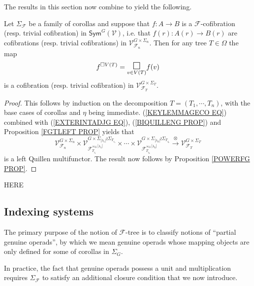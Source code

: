 \documentclass[a4paper,10pt]{article}%
\begin{document}
The results in this section now combine to yield the following.


\begin{proposition}\label{AUTTCOFPUSH PROP}
  Let $\Sigma_{\mathcal{F}}$ be a family of corollas 
  and suppose that 
  $f \colon A \to B$ is a $\mathcal{F}$-cofibration (resp. trivial cofibration)
  in $\mathsf{Sym}^G(\mathcal{V})$, i.e. that 
  $f(r) \colon A(r) \to B(r)$ are cofibrations (resp. trivial cofibrations) in 
  $\mathcal{V}^{G \times \Sigma_n}_{\mathcal{F}_n}$. Then for any tree $T \in \Omega$ the map
  \[
  f^{\square V(T)} = 
  \underset{v \in V(T)}{\mathlarger{\mathlarger{\square}}}
  f(v)\]
  is a cofibration (resp. trivial cofibration) in 
  $\mathcal{V}^{G \times \Sigma_T}_{\mathcal{F}_T}$.
\end{proposition}


\begin{proof}
  This follows by induction on the decomposition 
  $T=(T_1,\cdots,T_n)$, with the base cases of corollas and $\eta$ being immediate. (\ref{KEYLEMMAGECO EQ}) combined with (\ref{EXTERINTADJG EQ}), (\ref{BIQUILLENG PROP}) and Proposition \ref{FGTLEFT PROP} yields that
  \[
  \mathcal{V}^{G \times \Sigma_n}_{\mathcal{F}_n}	
  \times
  \mathcal{V}
  ^{G \times \Sigma_{|\lambda_1|}\wr \Sigma_{T_{i_1}}}
  _{\mathcal{F}_{T_{i_1}}^{\ltimes_G |\lambda_1|}}
  \times \cdots \times
  \mathcal{V}
  ^{G \times \Sigma_{|\lambda_k|}\wr \Sigma_{T_{i_k}}}
  _{\mathcal{F}_{T_{i_k}}^{\ltimes_G |\lambda_k|}}
  \xrightarrow{\otimes}
  \mathcal{V}^{G \times \Sigma_T}_{\mathcal{F}_T}
  \]
  is a left Quillen multifunctor.
  The result now follows by Proposition \ref{POWERFG PROP}. 
\end{proof}

{\color{red} HERE}


\subsection{Indexing systems}


The primary purpose of the notion of $\mathcal{F}$-tree is to classify notions of ``partial genuine operads'', by which we mean genuine operads whose mapping objects are only defined for some of corollas in 
$\Sigma_G$.

In practice, the fact that genuine operads possess a unit and multiplication requires $\Sigma_{\mathcal{F}}$ to satisfy an additional closure condition that we now introduce.
\end{document}
